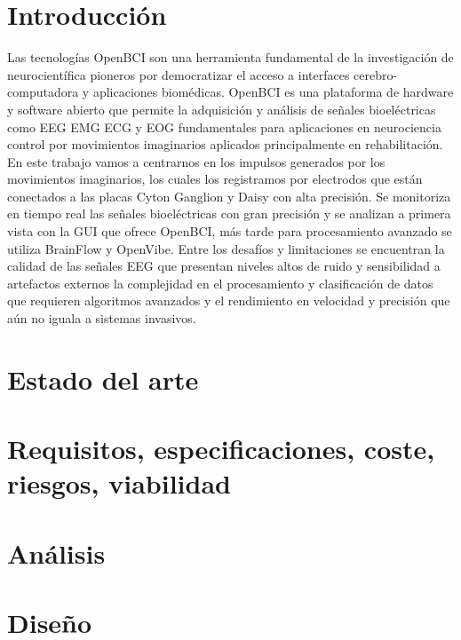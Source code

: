 \documentclass[twoside,spanish,a4paper,12pt]{tfg}
\begin{document}

\chapter{Introducción}

Las tecnologías OpenBCI son una herramienta fundamental de la investigación de neurocientífica pioneros por 
democratizar el acceso a interfaces cerebro-computadora y aplicaciones biomédicas. 
OpenBCI es una plataforma de hardware y software abierto que permite la adquisición y análisis de señales bioeléctricas 
como EEG EMG ECG y EOG fundamentales para aplicaciones en neurociencia control por movimientos imaginarios aplicados principalmente en rehabilitación. 
En este trabajo vamos a centrarnos en los impulsos generados por los movimientos imaginarios, los cuales los registramos 
por electrodos que están conectados a las placas Cyton Ganglion y Daisy con alta precisión. 
Se monitoriza en tiempo real las señales bioeléctricas con gran precisión y se analizan a primera vista con la GUI que ofrece OpenBCI, 
más tarde para procesamiento avanzado se utiliza BrainFlow y OpenVibe.
Entre los desafíos y limitaciones se encuentran la calidad de las señales EEG que presentan niveles altos de ruido y sensibilidad a artefactos 
externos la complejidad en el procesamiento y clasificación de datos que requieren algoritmos avanzados y el rendimiento en velocidad y precisión que aún no iguala a sistemas invasivos.



\chapter{Estado del arte}


\chapter{Requisitos, especificaciones, coste, riesgos, viabilidad}


\chapter{Análisis}


\chapter{Diseño}

\end{document}
